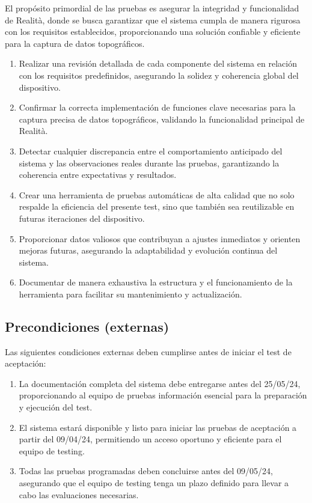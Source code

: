 \documentclass[12pt,a4paper, twoside]{article} %
\begin{document}
El propósito primordial de las pruebas es asegurar la integridad y funcionalidad de Realità, donde se busca garantizar que el sistema cumpla de manera rigurosa con los requisitos establecidos, proporcionando una solución confiable y eficiente para la captura de datos topográficos.


\begin{enumerate}
\item Realizar una revisión detallada de cada componente del sistema en relación con los requisitos predefinidos, asegurando la solidez y coherencia global del dispositivo.

\item Confirmar la correcta implementación de funciones clave necesarias para la captura precisa de datos topográficos, validando la funcionalidad principal de Realità.

\item Detectar cualquier discrepancia entre el comportamiento anticipado del sistema y las observaciones reales durante las pruebas, garantizando la coherencia entre expectativas y resultados.

\item Crear una herramienta de pruebas automáticas de alta calidad que no solo respalde la eficiencia del presente test, sino que también sea reutilizable en futuras iteraciones del dispositivo.

\item Proporcionar datos valiosos que contribuyan a ajustes inmediatos y orienten mejoras futuras, asegurando la adaptabilidad y evolución continua del sistema.

\item Documentar de manera exhaustiva la estructura y el funcionamiento de la herramienta para facilitar su mantenimiento y actualización.

\end{enumerate}

\subsection{Precondiciones (externas)}
\label{sec:requisitos-especificos}

Las siguientes condiciones externas deben cumplirse antes de iniciar el test de aceptación:

\begin{enumerate}
\item La documentación completa del sistema debe entregarse antes del 25/05/24, proporcionando al equipo de pruebas información esencial para la preparación y ejecución del test.

\item El sistema estará disponible y listo para iniciar las pruebas de aceptación a partir del 09/04/24, permitiendo un acceso oportuno y eficiente para el equipo de testing.

\item Todas las pruebas programadas deben concluirse antes del 09/05/24, asegurando que el equipo de testing tenga un plazo definido para llevar a cabo las evaluaciones necesarias.



\end{enumerate}
\end{document}
